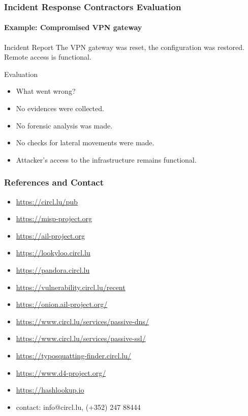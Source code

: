 \begin{frame}	
	\frametitle{Incident Response Contractors Evaluation}
	\framesubtitle{Example: Compromised VPN gateway}
	\begin{block}{Incident Report}
		The VPN gateway was reset, the configuration was restored. Remote access is functional. 
	\end{block}
	\begin{block}{Evaluation}
		\begin{itemize}
  			\item What went wrong?
  			\pause
			\item No evidences were collected.
			\item No forensic analysis was made.
			\item No checks for lateral movements were made.
			\item Attacker's access to the infrastructure remains functional.
		\end{itemize}
	\end{block}
\end{frame}



\begin{frame}
\frametitle{References and Contact}
\begin{itemize}
	\item \url{https://circl.lu/pub}
	\item \url{https://misp-project.org}
	\item \url{https://ail-project.org}
	\item \url{https://lookyloo.circl.lu}
	\item \url {https://pandora.circl.lu}
	\item \url {https://vulnerability.circl.lu/recent}
	\item \url{https://onion.ail-project.org/}
	\item \url{https://www.circl.lu/services/passive-dns/}
	\item \url{https://www.circl.lu/services/passive-ssl/}
	\item \url{https://typosquatting-finder.circl.lu/}
	\item \url{https://www.d4-project.org/}
	\item \url{https://hashlookup.io}
	\item contact: info@circl.lu,  (+352) 247 88444
\end{itemize}
\end{frame}
